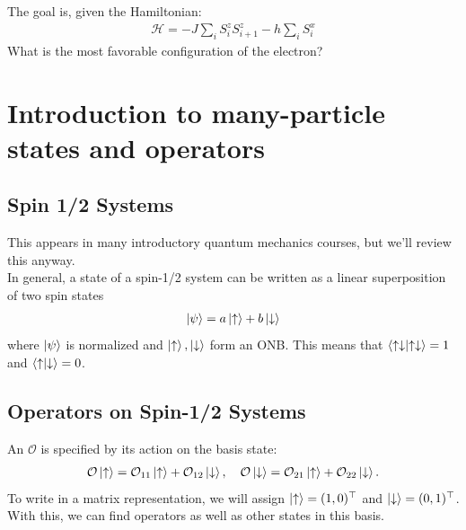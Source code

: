 \documentclass{book}
\theoremstyle{definition}
\newcommand{\had}{\mathcal{H}}
\begin{document}
The goal is, given the Hamiltonian:
\begin{align}
\had = -J \sum_i S^z_i S^z_{i+1} - h \sum_i S^x_i
\end{align}
What is the most favorable configuration of the electron?


















\section{Introduction to many-particle states and operators}

\subsection{Spin 1/2 Systems} 

This appears in many introductory quantum mechanics courses, but we'll review this anyway. \\

In general, a state of a spin-1/2 system  can be written as a linear superposition of two spin states
\begin{align}
\ket{\psi} = a\ket{\uparrow} + b\ket{\downarrow}
\end{align}
where $\ket{\psi}$ is normalized and $\ket{\uparrow},\ket{\downarrow}$ form an ONB. This means that $\braket{\uparrow\downarrow} = 1$ and $\braket{\uparrow}{\downarrow} = 0$. 

\subsection{Operators on Spin-1/2 Systems}
An $\mathcal{O}$ is specified by its action on the basis state: 
\begin{align}
\mathcal{O}\ket{\uparrow} = \mathcal{O}_{11}\ket{\uparrow} + \mathcal{O}_{12}\ket{\downarrow},\quad \mathcal{O}\ket{\downarrow} = \mathcal{O}_{21}\ket{\uparrow} + \mathcal{O}_{22}\ket{\downarrow}.
\end{align}
To write in a matrix representation, we will assign $\ket{\uparrow} = (1,0)^\top$ and $\ket{\downarrow} = (0,1)^\top$. With this, we can find operators as well as other states in this basis.\\
\end{document}

